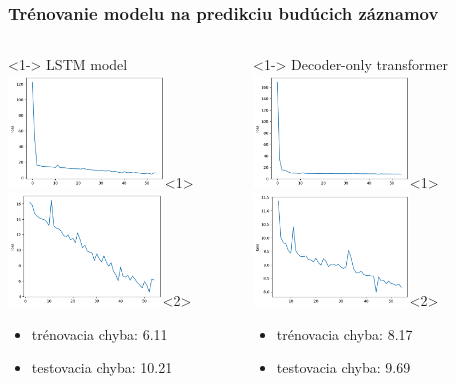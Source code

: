 \documentclass[slovak]{beamer}
\begin{document}
\begin{frame}
	\frametitle{Trénovanie modelu na predikciu budúcich záznamov}

	\begin{columns}[T]%
		\begin{column}{.48\textwidth}<1->%
			LSTM model 
			\includegraphics[height=3cm]{images/rnn_train_loss_1.png}<1>
			\includegraphics[height=3cm]{images/rnn_train_loss_2.png}<2>
			
			\begin{itemize}
				\item<1-> trénovacia chyba: 6.11
				\item<1-> testovacia chyba: 10.21
			\end{itemize}
		\end{column}
		\hfill%
		\begin{column}{.48\textwidth}<1->%
			Decoder-only transformer  
			\includegraphics[height=3cm]{images/trans_train_loss_1.png}<1>
			\includegraphics[height=3cm]{images/trans_train_loss_2.png}<2>
			
			\begin{itemize} 
				\item<1-> trénovacia chyba: 8.17
				\item<1-> testovacia chyba: 9.69
			\end{itemize}
		\end{column}  
	\end{columns}
\end{frame}
\end{document}
